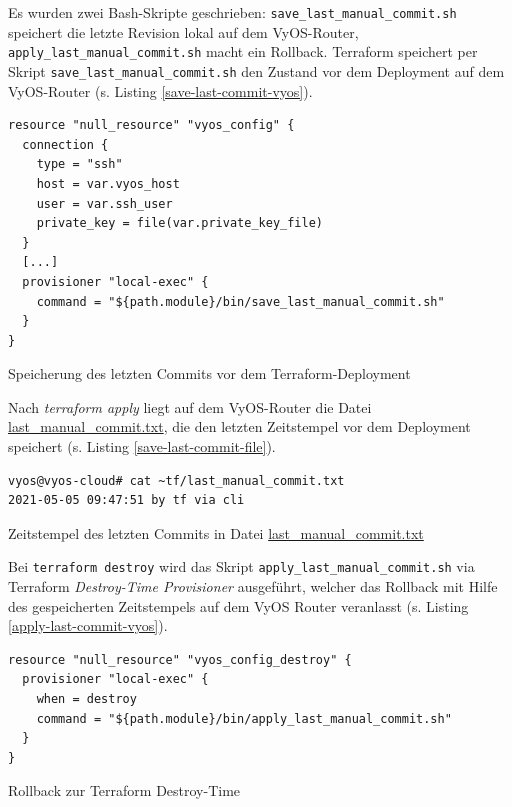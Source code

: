 Es wurden zwei Bash-Skripte geschrieben: \texttt{save\_last\_manual\_commit.sh} speichert die letzte Revision lokal auf dem VyOS-Router, \texttt{apply\_last\_manual\_commit.sh} macht ein Rollback. Terraform speichert per Skript \texttt{save\_last\_manual\_commit.sh} den Zustand vor dem \gls{Deployment} auf dem VyOS-Router (s. Listing \ref{save-last-commit-vyos}).
\begin{listing}[h]
\begin{verbatim}
resource "null_resource" "vyos_config" {
  connection {
    type = "ssh"
    host = var.vyos_host
    user = var.ssh_user
    private_key = file(var.private_key_file)
  }
  [...]
  provisioner "local-exec" {
    command = "${path.module}/bin/save_last_manual_commit.sh"
  }
}

\end{verbatim}
\caption{Speicherung des letzten Commits vor dem Terraform-Deployment}
\label{save-last-commit-vyos}
\end{listing}\FloatBarrier
Nach \textit{terraform apply} liegt auf dem VyOS-Router die Datei \underline{last\_manual\_commit.txt}, die den letzten Zeitstempel vor dem Deployment speichert (s. Listing \ref{save-last-commit-file}).
\begin{listing}[h]
\begin{verbatim}
vyos@vyos-cloud# cat ~tf/last_manual_commit.txt
2021-05-05 09:47:51 by tf via cli
\end{verbatim}
\caption{Zeitstempel des letzten Commits in Datei \underline{last\_manual\_commit.txt}}
\label{save-last-commit-file}
\end{listing}\FloatBarrier
Bei \texttt{terraform destroy} wird das Skript \texttt{apply\_last\_manual\_commit.sh} via Terraform \textit{Destroy-Time Provisioner} ausgeführt, welcher das Rollback mit Hilfe des gespeicherten Zeitstempels auf dem VyOS Router veranlasst (s. Listing \ref{apply-last-commit-vyos}).
\begin{listing}[h]
\begin{verbatim}
resource "null_resource" "vyos_config_destroy" {
  provisioner "local-exec" {
    when = destroy
    command = "${path.module}/bin/apply_last_manual_commit.sh"
  }
}

\end{verbatim}
\caption{Rollback zur Terraform \glqq Destroy-Time\grqq{}}
\label{apply-last-commit-vyos}
\end{listing}\FloatBarrier
